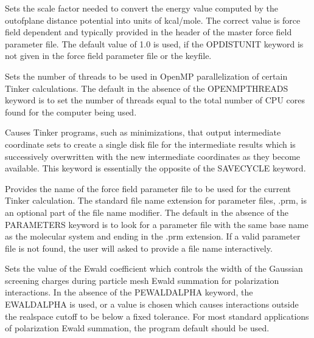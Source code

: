 \documentclass[letterpaper,11pt,english]{sphinxmanual}
\begin{document}
  Sets the scale factor needed to convert the energy value computed by the out\sphinxhyphen{}of\sphinxhyphen{}plane distance potential into units of kcal/mole. The correct value is force field dependent and typically provided in the header of the master force field parameter file. The default value of 1.0 is used, if the OPDISTUNIT keyword is not given in the force field parameter file or the keyfile.

  Sets the number of threads to be used in OpenMP parallelization of certain Tinker calculations. The default in the absence of the OPENMP\sphinxhyphen{}THREADS keyword is to set the number of threads equal to the total number of CPU cores found for the computer being used.


  Causes Tinker programs, such as minimizations, that output intermediate coordinate sets to create a single disk file for the intermediate results which is successively overwritten with the new intermediate coordinates as they become available. This keyword is essentially the opposite of the SAVECYCLE keyword.

  Provides the name of the force field parameter file to be used for the current Tinker calculation. The standard file name extension for parameter files, .prm, is an optional part of the file name modifier. The default in the absence of the PARAMETERS keyword is to look for a parameter file with the same base name as the molecular system and ending in the .prm extension. If a valid parameter file is not found, the user will asked to provide a file name interactively.









  Sets the value of the Ewald coefficient which controls the width of the Gaussian screening charges during particle mesh Ewald summation for polarization interactions. In the absence of the PEWALD\sphinxhyphen{}ALPHA keyword, the EWALD\sphinxhyphen{}ALPHA is used, or a value is chosen which causes interactions outside the real\sphinxhyphen{}space cutoff to be below a fixed tolerance. For most standard applications of polarization Ewald summation, the program default should be used.
\end{document}
